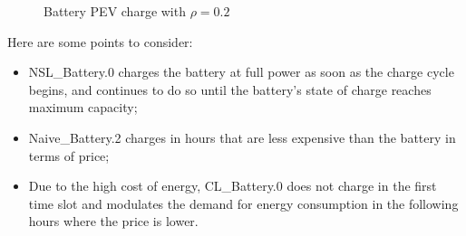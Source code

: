 \begin{figure}[h]
\begin{subfigure}[]{0.7\textwidth}
        \caption{}
    \end{subfigure}
    

    
\caption{Battery PEV charge with $\rho = 0.2$}
\label{fig:scen1}
\end{figure}

Here are some points to consider:
\begin{itemize}
    \item NSL\_Battery.0 charges the battery at full power as soon as the charge cycle begins, and continues to do so until the battery's state of charge reaches maximum capacity;
    \item Naive\_Battery.2 charges in hours that are less expensive than the battery in terms of price;
    \item Due to the high cost of energy, CL\_Battery.0 does not charge in the first time slot and modulates the demand for energy consumption in the following hours where the price is lower.
\end{itemize}

